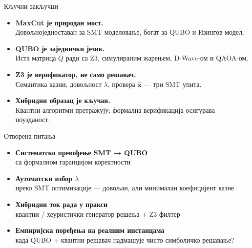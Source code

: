\documentclass[aspectratio=169]{beamer}
\begin{document}
\begin{frame}{Кључни закључци}
  \begin{itemize}
    \item \textbf{MaxCut је природан мост.}\\
          Довољноједноставан за SMT моделовање, богат за QUBO и Изингов модел.

    \bigskip
    \item \textbf{QUBO је заједнички језик.}\\
          Иста матрица $Q$ ради са Z3, симулираним жарењем, D-Wave-ом и QAOA-ом.

    \bigskip
    \item \textbf{Z3 је верификатор, не само решавач.}\\
          Семантика казни, довољност $\lambda$, провера $\hat{\mathbf{x}}$ — три SMT упита.

    \bigskip
    \item \textbf{Хибридни образац је кључан.}\\
          Квантни алгоритми претражују; формална верификација осигурава поузданост.
  \end{itemize}
\end{frame}

\begin{frame}{Отворена питања}
  \begin{itemize}
    \item \textbf{Систематско превођење SMT → QUBO}\\
          са формалном гаранцијом коректности

    \bigskip
    \item \textbf{Аутоматски избор $\lambda$}\\
          преко SMT оптимизације — довољан, али минималан коефицијент казне

    \bigskip
    \item \textbf{Хибридни ток рада у пракси}\\
          квантни / хеуристички генератор решења + Z3 филтер

    \bigskip
    \item \textbf{Емпиријска поређења на реалним инстанцама}\\
          када QUBO + квантни решавач надмашује чисто симболичко решавање?
  \end{itemize}
\end{frame}
\end{document}
